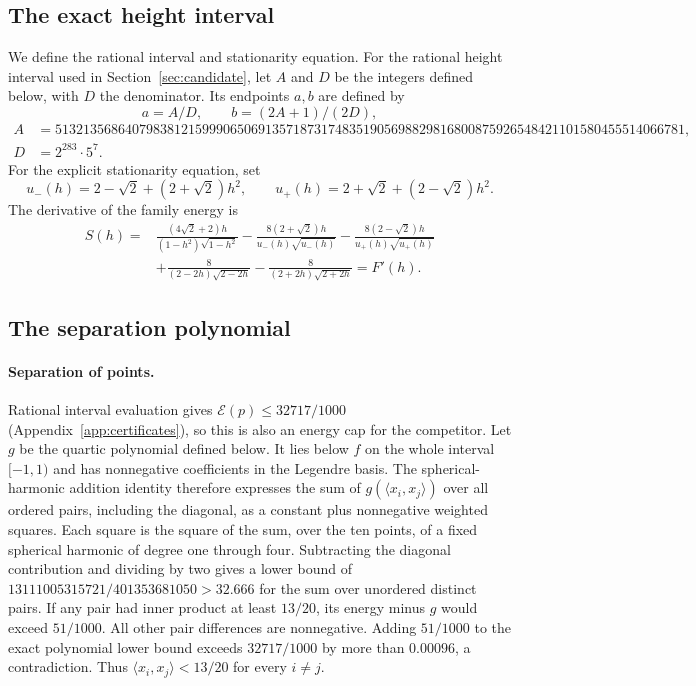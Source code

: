 \documentclass[11pt]{article}
\newcommand{\E}{\mathcal{E}}
\begin{document}
\begin{appendices}
\subsection{The exact height interval}\label{app:interval}
We define the rational interval and stationarity equation.
For the rational height interval used in Section~\ref{sec:candidate},
let $A$ and $D$ be the integers defined below, with $D$ the denominator.
Its endpoints $a,b$ are defined by
\[
 a=A/D,\qquad b=(2A+1)/(2D),
\]
{\scriptsize
\begin{align*}
 A&=513213568640798381215999065069135718731748351905698829816800875926548421101580455514066781,\\
 D&=2^{283}\cdot5^7.
\end{align*}
}
For the explicit stationarity equation, set
\[
 u_-(h)=2-\sqrt2+(2+\sqrt2)h^2,\qquad
 u_+(h)=2+\sqrt2+(2-\sqrt2)h^2.
\]
The derivative of the family energy is
\begin{align}
 S(h)={}&\frac{(4\sqrt2+2)h}{(1-h^2)\sqrt{1-h^2}}
 -\frac{8(2+\sqrt2)h}{u_-(h)\sqrt{u_-(h)}}
 -\frac{8(2-\sqrt2)h}{u_+(h)\sqrt{u_+(h)}}\nonumber\\
 &+\frac8{(2-2h)\sqrt{2-2h}}-\frac8{(2+2h)\sqrt{2+2h}}=F'(h).
 \label{eq:stationarity}
\end{align}

\subsection{The separation polynomial}\label{app:separation}
\paragraph{Separation of points.}
Rational interval evaluation gives $\E(p)\leq32717/1000$
(Appendix~\ref{app:certificates}), so this is also an energy cap for
the competitor.
Let $g$ be the quartic polynomial defined below. It lies below $f$ on the whole interval
$[-1,1)$ and has nonnegative coefficients in the Legendre basis.
The spherical-harmonic addition identity therefore expresses the sum of
$g(\langle x_i,x_j\rangle)$ over all ordered pairs, including the
diagonal, as a constant plus nonnegative weighted squares. Each square
is the square of the sum, over the ten points, of a fixed spherical
harmonic of degree one through four. Subtracting the diagonal contribution
and dividing by two gives a lower bound of
$13111005315721/401353681050>32.666$ for the sum over unordered distinct pairs.
If any pair had inner product at least $13/20$, its energy minus $g$
would exceed $51/1000$. All other pair differences are nonnegative.
Adding $51/1000$ to the exact polynomial lower bound exceeds
$32717/1000$ by more than $0.00096$, a contradiction. Thus $\langle x_i,x_j\rangle<13/20$ for every $i\ne j$.


\end{appendices}
\end{document}
